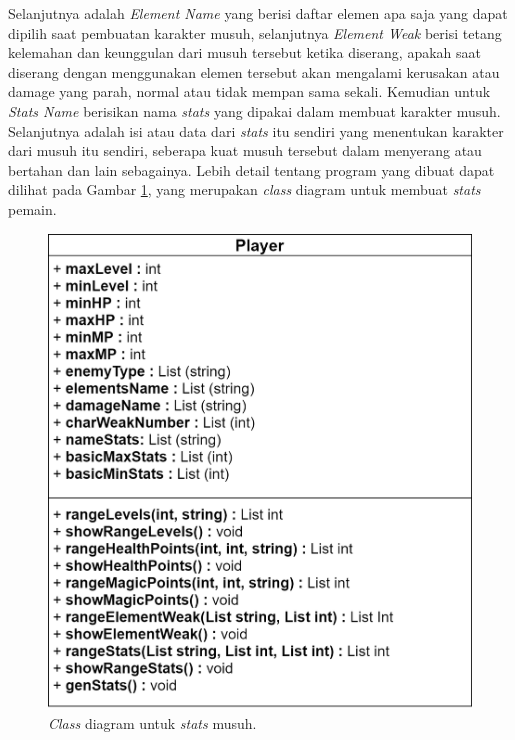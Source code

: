 Selanjutnya adalah \textit{Element Name} yang berisi daftar elemen apa saja yang dapat dipilih saat pembuatan karakter musuh, selanjutnya \textit{Element Weak} berisi tetang kelemahan dan keunggulan dari musuh tersebut ketika diserang, apakah saat diserang dengan menggunakan elemen tersebut akan mengalami kerusakan atau damage yang parah, normal atau tidak mempan sama sekali. Kemudian untuk \textit{Stats Name} berisikan nama \textit{stats} yang dipakai dalam membuat karakter musuh. Selanjutnya adalah isi atau data dari \textit{stats} itu sendiri yang menentukan karakter dari musuh itu sendiri, seberapa kuat musuh tersebut dalam menyerang atau bertahan dan lain sebagainya. Lebih detail tentang program yang dibuat dapat dilihat pada Gambar \ref{fig:enemy_uml}, yang merupakan \textit{class} diagram untuk membuat \textit{stats} pemain.
\vspace{1ex}

\begin{figure} [!h] \centering
	\includegraphics[scale=0.28]{img/enemy_uml.png}
	\caption{\textit{Class} diagram untuk \textit{stats} musuh.}
	\label{fig:enemy_uml}
\end{figure}

